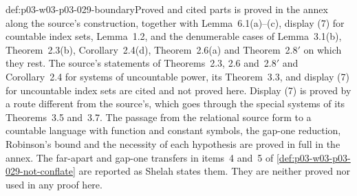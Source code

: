 \begin{proofboundary}{def:p03-w03-p03-029-boundary}{Proved and cited parts}
 is proved in the annex along the
source's construction, together with Lemma~6.1(a)--(c), display (7) for
countable index sets, Lemma~1.2, and the denumerable cases of Lemma~3.1(b),
Theorem~2.3(b), Corollary~2.4(d), Theorem~2.6(a) and Theorem~2.8\('\) on
which they rest. The source's statements of Theorems~2.3, 2.6 and~2.8\('\)
and Corollary~2.4 for systems of uncountable power, its Theorem~3.3, and
display (7) for uncountable index sets are cited and not proved here. Display
(7) is proved by a route different from the source's, which goes through the
special systems of its Theorems~3.5 and~3.7. The passage from the relational source form to a countable language with
function and constant symbols, the gap-one reduction, Robinson's bound and
the necessity of each hypothesis are proved in full in the annex. The
far-apart and gap-one transfers in items~4 and~5 of
\cref{def:p03-w03-p03-029-not-conflate} are reported as Shelah states them.
They are neither proved nor used in any proof here.
\end{proofboundary}
